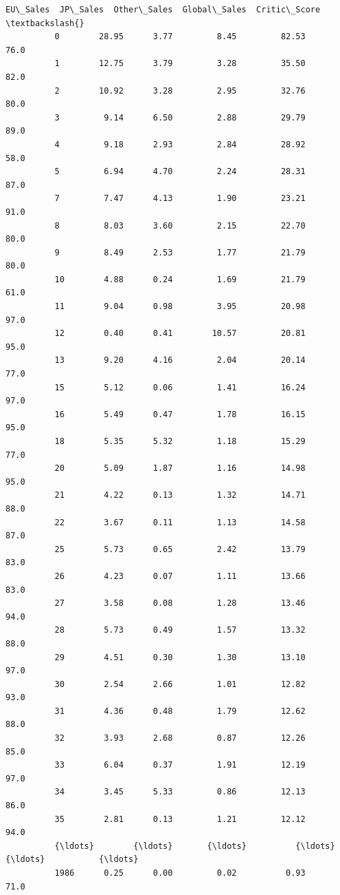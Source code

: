 \documentclass[11pt]{article}
\begin{document}
\begin{Verbatim}[commandchars=\\\{\}]
                EU\_Sales  JP\_Sales  Other\_Sales  Global\_Sales  Critic\_Score  \textbackslash{}
          0        28.95      3.77         8.45         82.53          76.0   
          1        12.75      3.79         3.28         35.50          82.0   
          2        10.92      3.28         2.95         32.76          80.0   
          3         9.14      6.50         2.88         29.79          89.0   
          4         9.18      2.93         2.84         28.92          58.0   
          5         6.94      4.70         2.24         28.31          87.0   
          7         7.47      4.13         1.90         23.21          91.0   
          8         8.03      3.60         2.15         22.70          80.0   
          9         8.49      2.53         1.77         21.79          80.0   
          10        4.88      0.24         1.69         21.79          61.0   
          11        9.04      0.98         3.95         20.98          97.0   
          12        0.40      0.41        10.57         20.81          95.0   
          13        9.20      4.16         2.04         20.14          77.0   
          15        5.12      0.06         1.41         16.24          97.0   
          16        5.49      0.47         1.78         16.15          95.0   
          18        5.35      5.32         1.18         15.29          77.0   
          20        5.09      1.87         1.16         14.98          95.0   
          21        4.22      0.13         1.32         14.71          88.0   
          22        3.67      0.11         1.13         14.58          87.0   
          25        5.73      0.65         2.42         13.79          83.0   
          26        4.23      0.07         1.11         13.66          83.0   
          27        3.58      0.08         1.28         13.46          94.0   
          28        5.73      0.49         1.57         13.32          88.0   
          29        4.51      0.30         1.30         13.10          97.0   
          30        2.54      2.66         1.01         12.82          93.0   
          31        4.36      0.48         1.79         12.62          88.0   
          32        3.93      2.68         0.87         12.26          85.0   
          33        6.04      0.37         1.91         12.19          97.0   
          34        3.45      5.33         0.86         12.13          86.0   
          35        2.81      0.13         1.21         12.12          94.0   
          {\ldots}        {\ldots}       {\ldots}          {\ldots}           {\ldots}           {\ldots}   
          1986      0.25      0.00         0.02          0.93          71.0   

\end{Verbatim}
\end{document}
